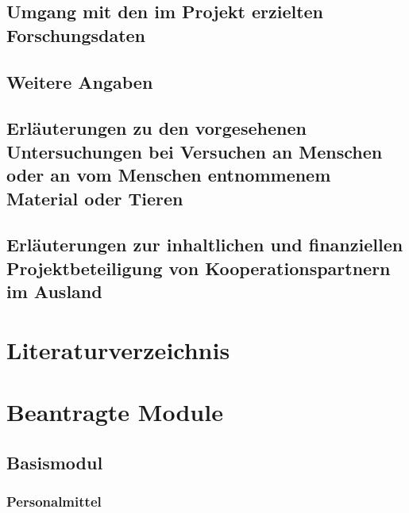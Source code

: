 \documentclass{scrartcl}
\begin{document}
\subsection{Umgang mit den im Projekt erzielten Forschungsdaten}

\subsection{Weitere Angaben}

\subsection{Erläuterungen zu den vorgesehenen Untersuchungen bei Versuchen an Menschen oder an vom Menschen entnommenem Material oder Tieren}

\subsection{Erläuterungen zur inhaltlichen und finanziellen Projektbeteiligung von Kooperationspartnern im Ausland}

\section{Literaturverzeichnis}

\printbibliography[notcategory=reviewed, notcategory=nonreviewed, notcategory=patents_pending, notcategory=patents, heading=none]


\section{Beantragte Module}

\subsection{Basismodul}

\subsubsection{Personalmittel}
\begin{funds}[Personalmittel]


\end{funds}
\end{document}
